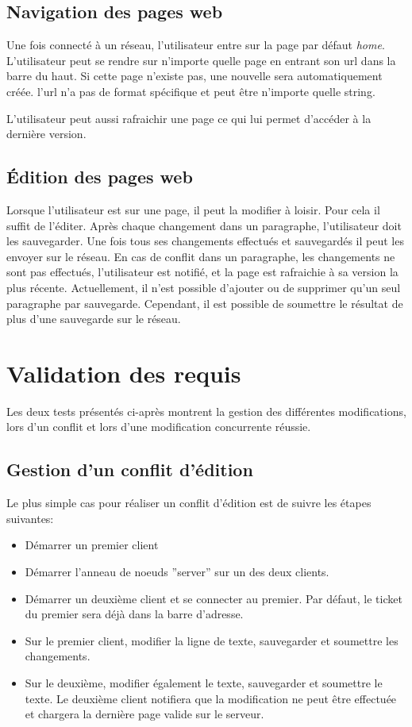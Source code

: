 \documentclass{article}
\begin{document}
	\subsection{Navigation des pages web}
	Une fois connecté à un réseau, l'utilisateur entre sur la page par défaut
	\emph{home}. L'utilisateur peut se rendre sur n'importe quelle page en
	entrant son url dans la barre du haut. Si cette page n'existe pas, 
	une nouvelle sera automatiquement créée. l'url n'a pas de format spécifique
	et peut être n'importe quelle string. 
	
	L'utilisateur peut aussi rafraichir une page ce qui lui permet d'accéder
	à la dernière version.
	
	\subsection{Édition des pages web}
	Lorsque l'utilisateur est sur une page, il peut la modifier à loisir.
	Pour cela il suffit de l'éditer. Après chaque changement dans un paragraphe,
	l'utilisateur doit les sauvegarder. Une fois tous ses changements
	effectués et sauvegardés il peut les envoyer sur le réseau. En cas
	de conflit dans un paragraphe, les changements ne sont pas effectués,
	l'utilisateur est notifié, et la page est rafraichie à sa version la plus
	récente.  Actuellement, il n'est possible d'ajouter ou de supprimer
	qu'un seul paragraphe par sauvegarde.  Cependant, il est possible de
	soumettre le résultat de plus d'une sauvegarde sur le réseau.
	
	\section{Validation des requis}
	Les deux tests présentés ci-après montrent la gestion des différentes modifications,
	lors d'un conflit et lors d'une modification concurrente réussie.
	
	\subsection{Gestion d'un conflit d'édition}
	Le plus simple cas pour réaliser un conflit d'édition est de suivre les étapes suivantes:
	\begin{itemize}
		\item Démarrer un premier client
		\item Démarrer l'anneau de noeuds ''server'' sur un des deux clients.
		\item Démarrer un deuxième client et se connecter au premier.  Par défaut, le ticket
			du premier sera déjà dans la barre d'adresse.
		\item Sur le premier client, modifier la ligne de texte, sauvegarder et soumettre les
			changements.
		\item Sur le deuxième, modifier également le texte, sauvegarder et soumettre le texte. 
			Le deuxième client notifiera que la modification ne peut être effectuée et chargera la dernière
			page valide sur le serveur.	
	\end{itemize}
	
\end{document}
